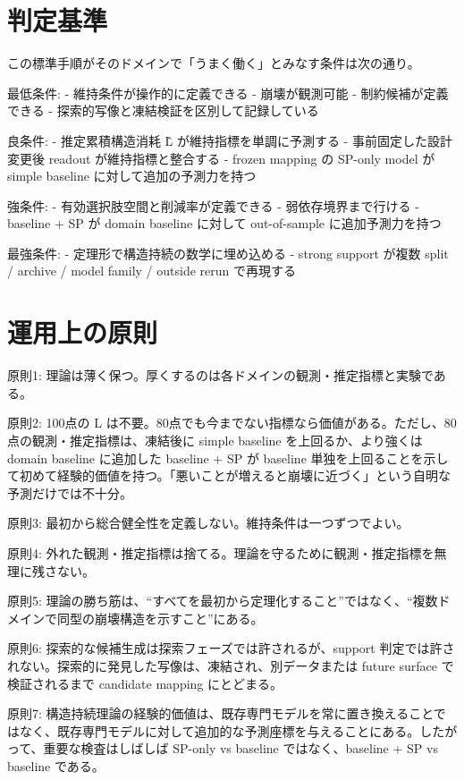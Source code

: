 \documentclass[12pt,a4paper]{article}
\begin{document}
\section{判定基準}\label{ux5224ux5b9aux57faux6e96}

この標準手順がそのドメインで「うまく働く」とみなす条件は次の通り。

最低条件: - 維持条件が操作的に定義できる - 崩壊が観測可能 - 制約候補が定義できる - 探索的写像と凍結検証を区別して記録している

良条件: - 推定累積構造消耗 L̂ が維持指標を単調に予測する - 事前固定した設計変更後 readout が維持指標と整合する - frozen mapping の SP-only model が simple baseline に対して追加の予測力を持つ

強条件: - 有効選択肢空間と削減率が定義できる - 弱依存境界まで行ける - baseline + SP が domain baseline に対して out-of-sample に追加予測力を持つ

最強条件: - 定理形で構造持続の数学に埋め込める - strong support が複数 split / archive / model family / outside rerun で再現する

\section{運用上の原則}\label{ux904bux7528ux4e0aux306eux539fux5247}

原則1: 理論は薄く保つ。厚くするのは各ドメインの観測・推定指標と実験である。

原則2: 100点の L は不要。80点でも今までない指標なら価値がある。ただし、80点の観測・推定指標は、凍結後に simple baseline を上回るか、より強くは domain baseline に追加した baseline + SP が baseline 単独を上回ることを示して初めて経験的価値を持つ。「悪いことが増えると崩壊に近づく」という自明な予測だけでは不十分。

原則3: 最初から総合健全性を定義しない。維持条件は一つずつでよい。

原則4: 外れた観測・推定指標は捨てる。理論を守るために観測・推定指標を無理に残さない。

原則5: 理論の勝ち筋は、``すべてを最初から定理化すること''ではなく、``複数ドメインで同型の崩壊構造を示すこと''にある。

原則6: 探索的な候補生成は探索フェーズでは許されるが、support 判定では許されない。探索的に発見した写像は、凍結され、別データまたは future surface で検証されるまで candidate mapping にとどまる。

原則7: 構造持続理論の経験的価値は、既存専門モデルを常に置き換えることではなく、既存専門モデルに対して追加的な予測座標を与えることにある。したがって、重要な検査はしばしば SP-only vs baseline ではなく、baseline + SP vs baseline である。
\end{document}
